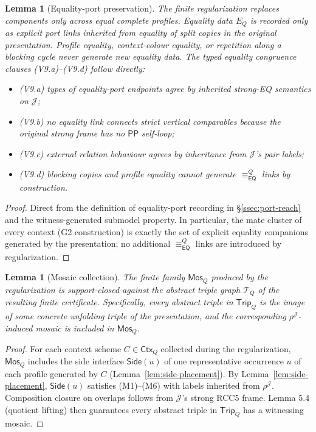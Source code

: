 \documentclass[11pt]{article}
\newtheorem{lemma}[theorem]{Lemma}
\newcommand{\EQ}{\mathsf{EQ}}
\newcommand{\PP}{\mathsf{PP}}
\newcommand{\J}{\mathcal J}
\newcommand{\Mos}{\mathsf{Mos}}
\newcommand{\Ctx}{\mathsf{Ctx}}
\newcommand{\eqc}{\equiv_{\EQ}}
\newcommand{\Trip}{\mathsf{Trip}}
\newcommand{\Side}{\mathsf{Side}}
\begin{document}
\begin{lemma}[Equality-port preservation]\label{lem:eq-port-preservation}
The finite regularization replaces components only across equal
complete profiles.  Equality data $E_Q$ is recorded only as
explicit port links inherited from equality of split copies in the
original presentation.  Profile equality, context-colour equality,
or repetition along a blocking cycle never generate new equality
data.  The typed equality congruence clauses (V9.a)--(V9.d) follow
directly:
\begin{itemize}
\item (V9.a) types of equality-port endpoints agree by inherited
strong-EQ semantics on $\J$;
\item (V9.b) no equality link connects strict vertical comparables
because the original strong frame has no $\PP$ self-loop;
\item (V9.c) external relation behaviour agrees by inheritance from
$\J$'s pair labels;
\item (V9.d) blocking copies and profile equality cannot generate
$\eqc^Q$ links by construction.
\end{itemize}
\end{lemma}

\begin{proof}
Direct from the definition of equality-port recording in
\S\ref{ssec:port-reach} and the witness-generated submodel
property.  In particular, the mate cluster of every context (G2
construction) is exactly the set of explicit equality companions
generated by the presentation; no additional $\eqc^Q$ links are
introduced by regularization.
\end{proof}

\begin{lemma}[Mosaic collection]\label{lem:mosaic-collection}
The finite family $\Mos_Q$ produced by the regularization is
support-closed against the abstract triple graph $\mathcal T_Q$ of
the resulting finite certificate.  Specifically, every abstract
triple in $\Trip_Q$ is the image of some concrete unfolding triple
of the presentation, and the corresponding $\rho^\J$-induced mosaic
is included in $\Mos_Q$.
\end{lemma}

\begin{proof}
For each context scheme $C\in\Ctx_Q$ collected during the
regularization, $\Mos_Q$ includes the side interface
$\Side(u)$ of one representative occurrence $u$ of each profile
generated by $C$ (Lemma~\ref{lem:side-placement}).  By
Lemma~\ref{lem:side-placement}, $\Side(u)$ satisfies (M1)--(M6)
with labels inherited from $\rho^\J$.  Composition closure on
overlaps follows from $\J$'s strong RCC5 frame.  Lemma 5.4 (quotient
lifting) then guarantees every abstract triple in $\Trip_Q$ has a
witnessing mosaic.
\end{proof}
\end{document}
